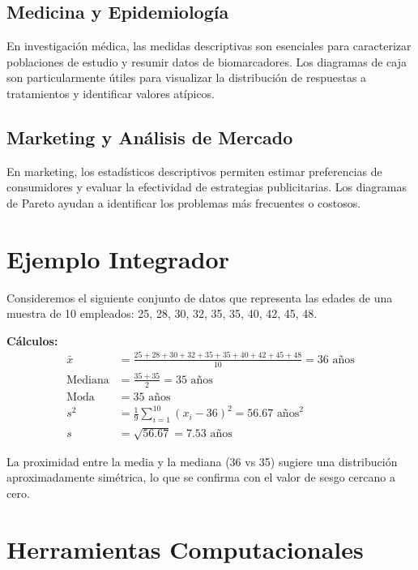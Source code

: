 \subsection{Medicina y Epidemiología}

En investigación médica, las medidas descriptivas son esenciales para caracterizar poblaciones de estudio y resumir datos de biomarcadores. Los diagramas de caja son particularmente útiles para visualizar la distribución de respuestas a tratamientos y identificar valores atípicos.

\subsection{Marketing y Análisis de Mercado}

En marketing, los estadísticos descriptivos permiten estimar preferencias de consumidores y evaluar la efectividad de estrategias publicitarias. Los diagramas de Pareto ayudan a identificar los problemas más frecuentes o costosos.

\section{Ejemplo Integrador}

Consideremos el siguiente conjunto de datos que representa las edades de una muestra de 10 empleados: 25, 28, 30, 32, 35, 35, 40, 42, 45, 48.

\textbf{Cálculos:}
\begin{align}
\bar{x} &= \frac{25 + 28 + 30 + 32 + 35 + 35 + 40 + 42 + 45 + 48}{10} = 36 \text{ años}\\
\text{Mediana} &= \frac{35 + 35}{2} = 35 \text{ años}\\
\text{Moda} &= 35 \text{ años}\\
s^2 &= \frac{1}{9} \sum_{i=1}^{10} (x_i - 36)^2 = 56.67 \text{ años}^2\\
s &= \sqrt{56.67} = 7.53 \text{ años}
\end{align}

\begin{remark}
La proximidad entre la media y la mediana (36 vs 35) sugiere una distribución aproximadamente simétrica, lo que se confirma con el valor de sesgo cercano a cero.
\end{remark}

\section{Herramientas Computacionales}


